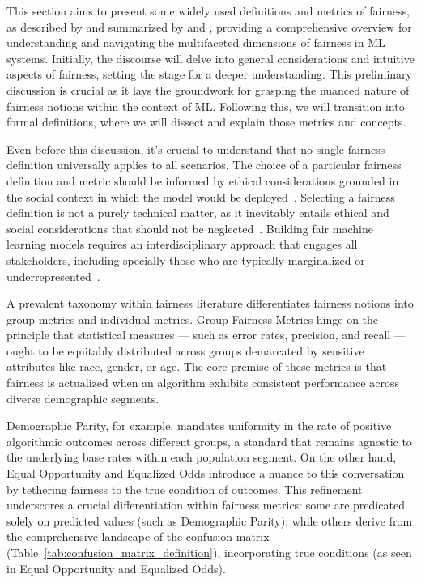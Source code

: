 This section aims to present some widely used definitions and metrics of fairness, as described by \cite{Verma2018} and summarized by \cite{Mehrabi2019} and \cite{caton2023}, providing a comprehensive overview for understanding and navigating the multifaceted dimensions of fairness in ML systems. Initially, the discourse will delve into general considerations and intuitive aspects of fairness, setting the stage for a deeper understanding. This preliminary discussion is crucial as it lays the groundwork for grasping the nuanced nature of fairness notions within the context of ML. Following this, we will transition into formal definitions, where we will dissect and explain those metrics and concepts.

Even before this discussion, it's crucial to understand that no single fairness definition universally applies to all scenarios. The choice of a particular fairness definition and metric should be informed by ethical considerations grounded in the social context in which the model would be deployed~\citep{AlerTubella2022}. Selecting a fairness definition is not a purely technical matter, as it inevitably entails ethical and social considerations that should not be neglected~\citep{Alves2023}. Building fair machine learning models requires an interdisciplinary approach that engages all stakeholders, including specially those who are typically marginalized or underrepresented~\citep{Weinberg2022}.

A prevalent taxonomy within fairness literature differentiates fairness notions into group metrics and individual metrics. Group Fairness Metrics hinge on the principle that statistical measures — such as error rates, precision, and recall — ought to be equitably distributed across groups demarcated by sensitive attributes like race, gender, or age. The core premise of these metrics is that fairness is actualized when an algorithm exhibits consistent performance across diverse demographic segments.

Demographic Parity, for example, mandates uniformity in the rate of positive algorithmic outcomes across different groups, a standard that remains agnostic to the underlying base rates within each population segment. On the other hand, Equal Opportunity and Equalized Odds introduce a nuance to this conversation by tethering fairness to the true condition of outcomes. This refinement underscores a crucial differentiation within fairness metrics: some are predicated solely on predicted values (such as Demographic Parity), while others derive from the comprehensive landscape of the confusion matrix (Table~\ref{tab:confusion_matrix_definition}), incorporating true conditions (as seen in Equal Opportunity and Equalized Odds).

